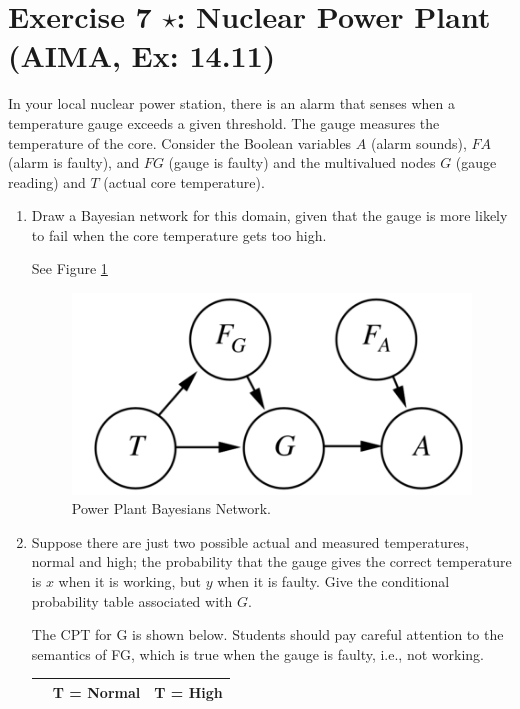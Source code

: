 \documentclass[9pt,a4paper]{extarticle}
\newenvironment{solution}
    {%
    \color{red}
    }
    { 
    \color{black}
    }
\begin{document}
\section*{Exercise 7 $\star$: Nuclear Power Plant (AIMA, Ex: 14.11)}
In your local nuclear power station, there is an alarm that senses when a temperature gauge exceeds a given threshold. The gauge measures the temperature of the core. Consider the Boolean variables $A$ (alarm sounds), $FA$ (alarm is faulty), and $FG$ (gauge is faulty) and the multivalued nodes $G$ (gauge reading) and $T$ (actual core temperature).
\begin{enumerate}
    \item Draw a Bayesian network for this domain, given that the gauge is more likely to fail when the core temperature gets too high.
    \begin{solution}
    See Figure \ref{fig:nuclear_bnet}
    \begin{figure}[h]
        \centering
        \includegraphics[width=.8\textwidth]{figures/nuclear_bnet.png}
        \caption{Power Plant Bayesians Network.}
        \label{fig:nuclear_bnet}
    \end{figure}
    \end{solution}
    \item Suppose there are just two possible actual and measured temperatures, normal and high; the probability that the gauge gives the correct temperature is $x$ when it is working, but $y$ when it is faulty. Give the conditional probability table associated with $G$.
    \begin{solution}
    The CPT for G is shown below. Students should pay careful attention to the semantics of FG, which is true when the gauge is faulty, i.e., not working.
    \begin{table}[h]
        \centering
        \begin{tabular}{|c|c|c|c|c|}
        \hline
             &  \multicolumn{2}{c|}{T = Normal} & \multicolumn{2}{c|}{T = High} \\ \hline

\end{tabular}
\end{table}
\end{solution}
\end{enumerate}
\end{document}
